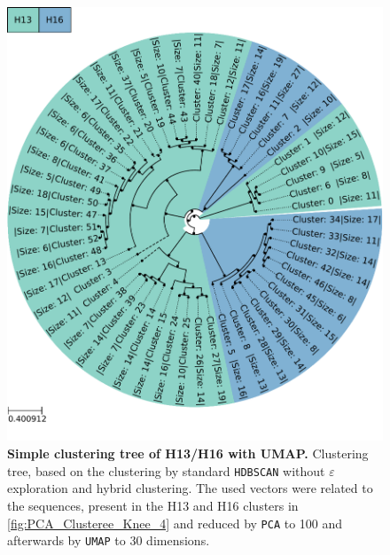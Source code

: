 \begin{figure}[!hbt]
    \centering
    \includegraphics[width=\textwidth]{UMAP/Clustertree_Segment_4_H_Simple.pdf}
    \caption[Simple clustering tree of H13/H16 with UMAP]{\textbf{Simple clustering tree of H13/H16 with UMAP.} Clustering tree, based on the clustering by standard \texttt{HDBSCAN} without $\varepsilon$ exploration and hybrid clustering. The used vectors were related to the sequences, present in the H13 and H16 clusters in \autoref{fig:PCA_Clusteree_Knee_4} and reduced by \texttt{PCA} to 100 and afterwards by \texttt{UMAP} to 30 dimensions.}
    \label{fig:Simple_Clustertree_UMAP}
\end{figure}

\FloatBarrier
\newpage

